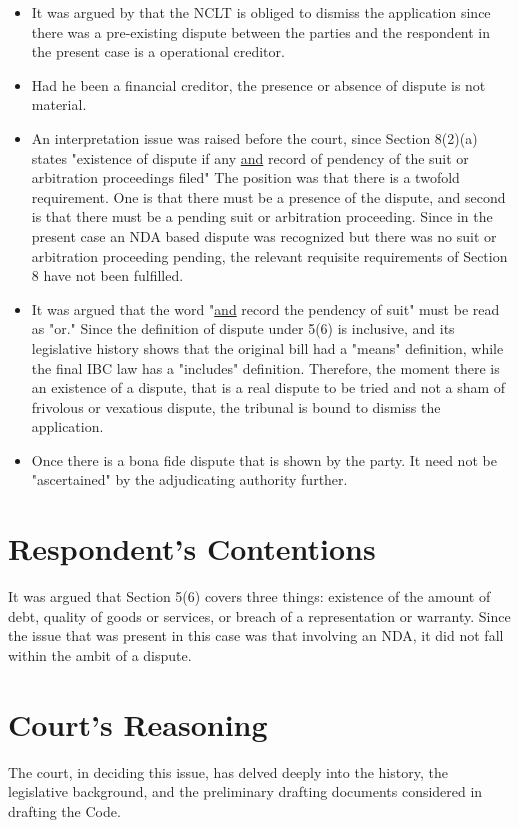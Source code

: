 \documentclass[12pt]{article}
\begin{document}
\begin{itemize}
\item It  was argued by that the NCLT is obliged to dismiss the application since there was a pre-existing dispute between the parties and the respondent in the present case is a operational creditor.
\item Had he been a financial creditor, the presence or absence of dispute is not material.
\item An interpretation issue was raised before the court, since Section 8(2)(a) states "existence of dispute if any \uline{and} record of pendency of the suit or arbitration proceedings filed" The position was that there is a twofold requirement. One is that there must be a presence of the dispute, and second is that there must be a pending suit or arbitration proceeding. Since in the present case an NDA based dispute was recognized but there was no suit or arbitration proceeding pending, the relevant requisite requirements of Section 8 have not been fulfilled.
\item It was argued that the word "\uline{and} record the pendency of suit" must be read as "or." Since the definition of dispute under 5(6) is inclusive, and its legislative history shows that the original bill had a "means" definition, while the final IBC law has a "includes" definition. Therefore, the moment there is an existence of a dispute, that is a real dispute to be tried and not a sham of frivolous or vexatious dispute, the tribunal is bound to dismiss the application.
\item Once there is a bona fide dispute that is shown by the party. It need not be "ascertained" by the adjudicating authority further.
\end{itemize}
\section*{Respondent's Contentions}
\label{sec:org8162707}
It was argued that Section 5(6) covers three things: existence of the amount of debt, quality of goods or services, or breach of a representation or warranty. Since the issue that was present in this case was that involving an NDA, it did not fall within the ambit of a dispute.
\section*{Court's Reasoning}
\label{sec:orgdb4d3d9}
The court, in deciding this issue, has delved deeply into the history, the legislative background, and the preliminary drafting documents considered in drafting the Code.
\end{document}
